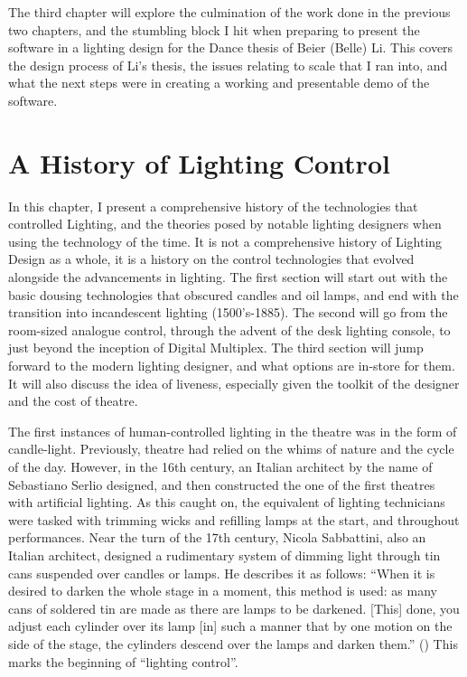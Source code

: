 \documentclass[
    12pt,
    twoside,
    bibstyle=chicago,
    headerstyle=uppercase,
	bibfile=thesis.bib
]{reedthesis}
\begin{document}
    The third chapter will explore the culmination of the work done in the previous two chapters, and the stumbling block I hit when preparing to present the software in a lighting design for the Dance thesis of Beier (Belle) Li. This covers the design process of Li's thesis, the issues relating to scale that I ran into, and what the next steps were in creating a working and presentable demo of the software.
	
\chapter{A History of Lighting Control}
In this chapter, I present a comprehensive history of the technologies that controlled Lighting, and the theories posed by notable lighting designers when using the technology of the time. It is not a comprehensive history of Lighting Design as a whole, it is a history on the control technologies that evolved alongside the advancements in lighting. The first section will start out with the basic dousing technologies that obscured candles and oil lamps, and end with the transition into incandescent lighting (1500's-1885). The second will go from the room-sized analogue control, through the advent of the desk lighting console, to just beyond the inception of Digital Multiplex. The third section will jump forward to the modern lighting designer, and what options are in-store for them. It will also discuss the idea of liveness, especially given the toolkit of the designer and the cost of theatre.

The first instances of human-controlled lighting in the theatre was in the form of candle-light. Previously, theatre had relied on the whims of nature and the cycle of the day. However, in the 16th century, an Italian architect by the name of Sebastiano Serlio designed, and then constructed the one of the first theatres with artificial lighting. \autocite{serlio_five_1611} As this caught on, the equivalent of lighting technicians were tasked with trimming wicks and refilling lamps at the start, and throughout performances. Near the turn of the 17th century, Nicola Sabbattini, also an Italian architect, designed a rudimentary system of dimming light through tin cans suspended over candles or lamps. He describes it as follows: “When it is desired to darken the whole stage in a moment, this method is used: as many cans of soldered tin are made as there are lamps to be darkened. [This] done, you adjust each cylinder over its lamp [in] such a manner that by one motion on the side of the stage, the cylinders descend over the lamps and darken them.” (\autocite{internet_archive_renaissance_1958}) This marks the beginning of “lighting control”.
 
\end{document}
